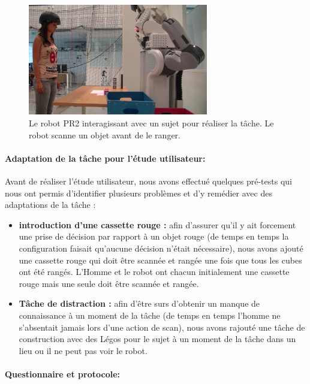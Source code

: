 \documentclass[english,a4paper,11pt,twoside]{StyleThese}
\begin{document}
\begin{figure}[!t]
	\centering
    \includegraphics[width=0.7\textwidth]{figs/Chapter5/Scan.png}
    \caption{Le robot PR2 interagissant avec un sujet pour réaliser la tâche. Le robot scanne un objet avant de le ranger.}
    \label{fig:scan}
\end{figure}


\paragraph{Adaptation de la tâche pour l'étude utilisateur:}

Avant de réaliser l'étude utilisateur, nous avons effectué quelques pré-tests qui nous ont permis d'identifier plusieurs problèmes et d'y remédier avec des adaptations de la tâche :
\begin{itemize}
\item \textbf{introduction d'une cassette rouge :} afin d'assurer qu'il y ait forcement une prise de décision par rapport à un objet rouge (de temps en temps la configuration faisait qu'aucune décision n'était nécessaire), nous avons ajouté une cassette rouge qui doit être scannée et rangée une fois que tous les cubes ont été rangés. L'Homme et le robot ont chacun initialement une cassette rouge mais une seule doit être scannée et rangée.
\item \textbf{Tâche de distraction :} afin d'être surs d'obtenir un manque de connaissance à un moment de la tâche (de temps en temps l'homme ne s'absentait jamais lors d'une action de scan), nous avons rajouté une tâche de construction avec des Légos pour le sujet à un moment de la tâche dans un lieu ou il ne peut pas voir le robot.
\end{itemize}


\paragraph{Questionnaire et protocole:}
\end{document}
